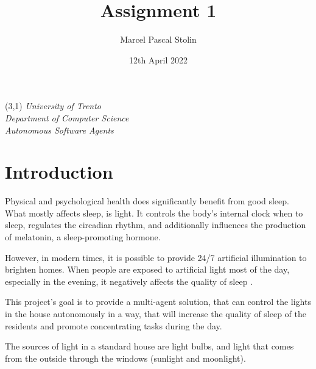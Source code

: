 \documentclass[letterpaper, 11pt]{Proposal}
\title{Assignment 1}
\author{Marcel Pascal Stolin}
\date{12th April 2022}
\begin{document}
\vspace{-10cm}

\begin{textblock}{10}(3,1)
\textit{University of Trento}\\
\textit{Department of Computer Science}\\
\textit{Autonomous Software Agents}
\end{textblock}

\maketitle



\vspace{-2cm}

\section{Introduction}\label{sec:01_intro}
Physical and psychological health does significantly benefit from good sleep.
What mostly affects sleep, is light.
It controls the body's internal clock when to sleep, 
regulates the circadian rhythm, 
and additionally influences the production of melatonin, 
a sleep-promoting hormone.

However, in modern times, it is possible to provide 24/7
artificial illumination to brighten homes.
When people are exposed to artificial light most of the day, especially in the evening,
it negatively affects the quality of sleep \cite{SuniSleep2022}.

This project's goal is to provide a multi-agent solution,
that can control the lights in the house autonomously
in a way, that will increase the quality of sleep of the
residents and promote concentrating tasks during the day.

The sources of light in a standard house are light bulbs, 
and light that comes from the outside through the windows (sunlight and moonlight).
\end{document}
